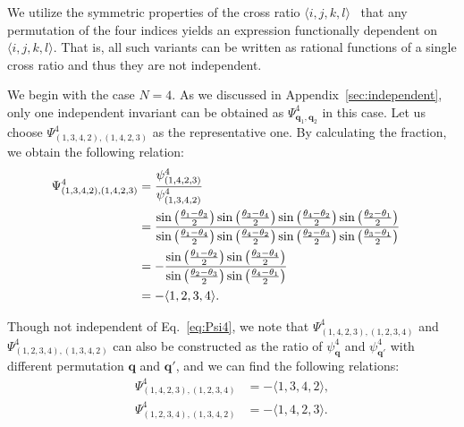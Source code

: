 \documentclass[
amsmath,amssymb,
]{revtex4-2}
\begin{document}
We utilize the symmetric properties of the cross ratio $\langle i,j,k,l\rangle$~\cite{Marvel2009identical} that any permutation of the four indices yields an expression functionally dependent on $\langle i,j,k,l\rangle$. That is, all such variants can be written as rational functions of a single cross ratio and thus they are not independent.

We begin with the case $N = 4$. 
%
As we discussed in Appendix~\ref{sec:independent}, only one independent invariant can be obtained as $\Psi^4_{\bm{q}_1,\bm{q}_2}$ in this case. Let us choose $\Psi^4_{(1,3,4,2), (1,4,2,3)}$ as the representative one. 
By calculating the fraction, we obtain the following relation:
%
\begin{align}
    \label{eq:Psi4}
    \Psi^4_{(1,3,4,2), (1,4,2,3)} &= \frac{\psi^4_{(1,4,2,3)}}{\psi^4_{(1,3,4,2)}} \cr
    &=\frac{\sin\left( \frac{\theta_{1} - \theta_{3}}{2} \right)\sin\left( \frac{\theta_{3} - \theta_{4}}{2} \right)\sin\left( \frac{\theta_{4} - \theta_{2}}{2} \right)\sin\left( \frac{\theta_{2} - \theta_{1}}{2} \right)}{\sin\left( \frac{\theta_{1} - \theta_{4}}{2} \right)\sin\left( \frac{\theta_{4} - \theta_{2}}{2} \right)\sin\left( \frac{\theta_{2} - \theta_{3}}{2} \right)\sin\left( \frac{\theta_{3} - \theta_{1}}{2} \right)}\cr
    &=-\frac{ \sin\left( \frac{\theta_{1} - \theta_{2}}{2} \right)\sin\left( \frac{\theta_{3} - \theta_{4}}{2} \right)
   }{\sin\left( \frac{\theta_{2} - \theta_{3}}{2} \right)\sin\left( \frac{\theta_{4} - \theta_{1}}{2} \right)}\cr
   &=-\langle 1,2,3,4\rangle.
\end{align}
%

Though not independent of Eq.~\eqref{eq:Psi4}, we note that $\Psi^4_{(1,4,2,3), (1,2,3,4)}$ and $\Psi^4_{(1,2,3,4), (1,3,4,2)}$ can also be constructed as the ratio of $\psi^4_{\bm{q}}$ and $\psi^4_{\bm{q}'}$ with different permutation $\bm{q}$ and $\bm{q}'$, and we can find the following relations:
%
\begin{align}
    \Psi^4_{(1,4,2,3), (1,2,3,4)} &= -\langle 1,3,4,2\rangle, \\
    \Psi^4_{(1,2,3,4), (1,3,4,2)} &= -\langle 1,4,2,3\rangle.
\end{align}
\end{document}
